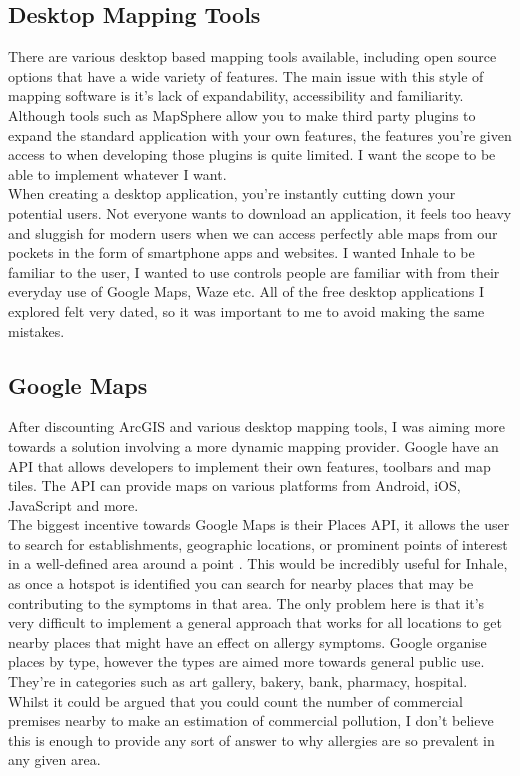 \subsection{Desktop Mapping Tools}

There are various desktop based mapping tools available, including open source options that have a wide variety of features. The main issue with this style of mapping software is it's lack of expandability, accessibility and familiarity.\\

Although tools such as MapSphere allow you to make third party plugins to expand the standard application with your own features, the features you're given access to when developing those plugins is quite limited. I want the scope to be able to implement whatever I want.\\

When creating a desktop application, you're instantly cutting down your potential users. Not everyone wants to download an application, it feels too heavy and sluggish for modern users when we can access perfectly able maps from our pockets in the form of smartphone apps and websites. I wanted Inhale to be familiar to the user, I wanted to use controls people are familiar with from their everyday use of Google Maps, Waze etc. All of the free desktop applications I explored felt very dated, so it was important to me to avoid making the same mistakes.\\

\subsection{Google Maps}

After discounting ArcGIS and various desktop mapping tools, I was aiming more towards a solution involving a more dynamic mapping provider. Google have an API that allows developers to implement their own features, toolbars and map tiles. The API can provide maps on various platforms from Android, iOS, JavaScript and more.\\

The biggest incentive towards Google Maps is their Places API, it allows the user to search for establishments, geographic locations, or prominent points of interest in a well-defined area around a point \cite{googlePlaces}. This would be incredibly useful for Inhale, as once a hotspot is identified you can search for nearby places that may be contributing to the symptoms in that area. The only problem here is that it's very difficult to implement a general approach that works for all locations to get nearby places that might have an effect on allergy symptoms. Google organise places by type, however the types are aimed more towards general public use. They're in categories such as art gallery, bakery, bank, pharmacy, hospital. Whilst it could be argued that you could count the number of commercial premises nearby to make an estimation of commercial pollution, I don't believe this is enough to provide any sort of answer to why allergies are so prevalent in any given area.\\

